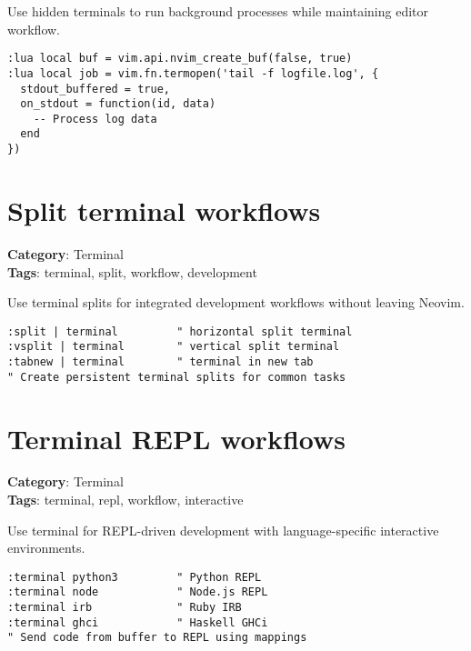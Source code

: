 {{{{{{{{{{Use hidden terminals to run background processes while maintaining editor workflow.

\begin{Exa*}{}
\begin{Verbatim}[fontsize=\footnotesize, breaklines, breakanywhere]
:lua local buf = vim.api.nvim_create_buf(false, true)
:lua local job = vim.fn.termopen('tail -f logfile.log', {
  stdout_buffered = true,
  on_stdout = function(id, data) 
    -- Process log data
  end
})
\end{Verbatim}
\end{Exa*}

\section{Split terminal workflows}

\textbf{Category}: Terminal\\ \textbf{Tags}: terminal, split, workflow, development
\vspace{0.5cm}

Use terminal splits for integrated development workflows without leaving Neovim.

\begin{Exa*}{}
\begin{Verbatim}[fontsize=\footnotesize, breaklines, breakanywhere]
:split | terminal         " horizontal split terminal
:vsplit | terminal        " vertical split terminal  
:tabnew | terminal        " terminal in new tab
" Create persistent terminal splits for common tasks
\end{Verbatim}
\end{Exa*}

\section{Terminal REPL workflows}

\textbf{Category}: Terminal\\ \textbf{Tags}: terminal, repl, workflow, interactive
\vspace{0.5cm}

Use terminal for REPL-driven development with language-specific interactive environments.

\begin{Exa*}{}
\begin{Verbatim}[fontsize=\footnotesize, breaklines, breakanywhere]
:terminal python3         " Python REPL
:terminal node            " Node.js REPL
:terminal irb             " Ruby IRB  
:terminal ghci            " Haskell GHCi
" Send code from buffer to REPL using mappings
\end{Verbatim}
\end{Exa*}

}}}}}}}}}}
